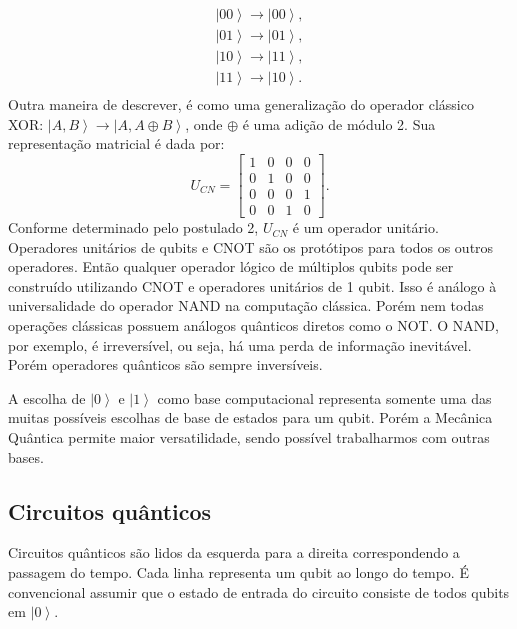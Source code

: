 \begin{equation}
\begin{split}
\left|00\right\rangle \rightarrow\left|00\right\rangle, \\
\left|01\right\rangle \rightarrow\left|01\right\rangle,  \\
\left|10\right\rangle \rightarrow\left|11\right\rangle,  \\
\left|11\right\rangle \rightarrow\left|10\right\rangle. \\
\end{split}
\end{equation}
Outra maneira de descrever, é como uma generalização do operador clássico XOR: $ \left|A,B\right\rangle \rightarrow\left|A,A\oplus B\right\rangle $,  onde $\oplus$ é uma adição de módulo 2. Sua representação matricial é dada por:
\begin{equation}
U_{CN}=\left[\begin{array}{cccc}
1 & 0 & 0 & 0\\
0 & 1 & 0 & 0\\
0 & 0 & 0 & 1\\
0 & 0 & 1 & 0
\end{array}\right]
. \end{equation}
Conforme determinado pelo postulado 2,  $U_{CN}$ é um operador unitário. Operadores unitários de qubits e CNOT são os protótipos para todos os outros operadores. Então qualquer operador lógico de múltiplos qubits pode ser construído utilizando CNOT e operadores unitários de 1 qubit. Isso é análogo à universalidade do operador NAND na computação clássica. Porém nem todas operações clássicas possuem análogos quânticos diretos como o NOT. O NAND, por exemplo, é irreversível, ou seja, há uma perda de informação inevitável. Porém operadores quânticos são sempre inversíveis.

A  escolha de $\left|0\right\rangle $ e $\left|1\right\rangle $ como base computacional representa somente uma das muitas possíveis escolhas de base de estados para um qubit. Porém a Mecânica Quântica permite maior versatilidade, sendo possível trabalharmos com outras bases. 

\subsection{Circuitos quânticos}

Circuitos quânticos são lidos da esquerda para a direita  correspondendo a passagem do tempo. Cada linha representa um qubit ao longo do tempo.  É convencional assumir que o estado de entrada do circuito consiste de todos qubits em $\left|0\right\rangle $. %

